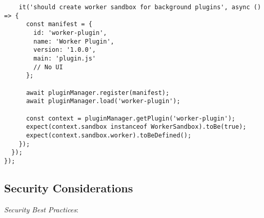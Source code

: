 \documentclass[11pt]{article}
\begin{document}
\begin{verbatim}
    it('should create worker sandbox for background plugins', async () => {
      const manifest = {
        id: 'worker-plugin',
        name: 'Worker Plugin',
        version: '1.0.0',
        main: 'plugin.js'
        // No UI
      };
      
      await pluginManager.register(manifest);
      await pluginManager.load('worker-plugin');
      
      const context = pluginManager.getPlugin('worker-plugin');
      expect(context.sandbox instanceof WorkerSandbox).toBe(true);
      expect(context.sandbox.worker).toBeDefined();
    });
  });
});
\end{verbatim}
\subsection{Security Considerations}
\label{sec:org1fa01cf}

\emph{Security Best Practices}:
\end{document}
